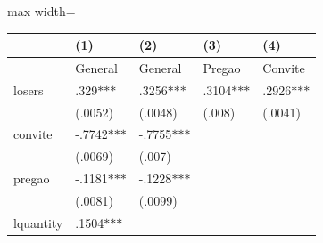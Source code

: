 {{\begin{table}[H]
\begin{adjustbox}{max width=\textwidth}
\begin{tabular}{p{3.98cm}p{2.52cm}p{2.53cm}p{2.53cm}p{2.45cm}}
\hline
\multicolumn{1}{|p{5.3cm}}{} &
\multicolumn{1}{|p{3.14cm}}{\centering
 (1)} &
\multicolumn{1}{|p{3.02cm}}{\centering
 (2)} &
\multicolumn{1}{|p{3.02cm}}{\centering
 (3)} &
\multicolumn{1}{|p{3.02cm}|}{\centering
 (4)} \\
\hline
\multicolumn{1}{|p{5.3cm}}{} &
\multicolumn{1}{|p{3.14cm}}{\centering
    General} &
\multicolumn{1}{|p{3.02cm}}{\centering
    General} &
\multicolumn{1}{|p{3.02cm}}{\centering
 Pregao} &
\multicolumn{1}{|p{3.02cm}|}{\centering
    Convite} \\
\hline
\multicolumn{1}{|p{5.3cm}}{ losers} &
\multicolumn{1}{|p{3.14cm}}{\centering
.329$\ast$$\ast$$\ast$} &
\multicolumn{1}{|p{3.02cm}}{\centering
.3256$\ast$$\ast$$\ast$} &
\multicolumn{1}{|p{3.02cm}}{\centering
.3104$\ast$$\ast$$\ast$} &
\multicolumn{1}{|p{3.02cm}|}{\centering
.2926$\ast$$\ast$$\ast$} \\
\hline
\multicolumn{1}{|p{5.3cm}}{} &
\multicolumn{1}{|p{3.14cm}}{\centering
(.0052)} &
\multicolumn{1}{|p{3.02cm}}{\centering
(.0048)} &
\multicolumn{1}{|p{3.02cm}}{\centering
(.008)} &
\multicolumn{1}{|p{3.02cm}|}{\centering
(.0041)} \\
\hline
\multicolumn{1}{|p{5.3cm}}{ convite} &
\multicolumn{1}{|p{3.14cm}}{\centering
-.7742$\ast$$\ast$$\ast$} &
\multicolumn{1}{|p{3.02cm}}{\centering
-.7755$\ast$$\ast$$\ast$} &
\multicolumn{1}{|p{3.02cm}}{} &
\multicolumn{1}{|p{3.02cm}|}{} \\
\hline
\multicolumn{1}{|p{5.3cm}}{} &
\multicolumn{1}{|p{3.14cm}}{\centering
(.0069)} &
\multicolumn{1}{|p{3.02cm}}{\centering
(.007)} &
\multicolumn{1}{|p{3.02cm}}{} &
\multicolumn{1}{|p{3.02cm}|}{} \\
\hline
\multicolumn{1}{|p{5.3cm}}{ pregao} &
\multicolumn{1}{|p{3.14cm}}{\centering
-.1181$\ast$$\ast$$\ast$} &
\multicolumn{1}{|p{3.02cm}}{\centering
-.1228$\ast$$\ast$$\ast$} &
\multicolumn{1}{|p{3.02cm}}{} &
\multicolumn{1}{|p{3.02cm}|}{} \\
\hline
\multicolumn{1}{|p{5.3cm}}{} &
\multicolumn{1}{|p{3.14cm}}{\centering
(.0081)} &
\multicolumn{1}{|p{3.02cm}}{\centering
(.0099)} &
\multicolumn{1}{|p{3.02cm}}{} &
\multicolumn{1}{|p{3.02cm}|}{} \\
\hline
\multicolumn{1}{|p{5.3cm}}{ lquantity} &
\multicolumn{1}{|p{3.14cm}}{\centering
.1504$\ast$$\ast$$\ast$} &

\end{tabular}
\end{adjustbox}
\end{table}}}

